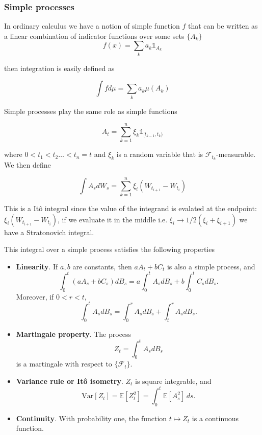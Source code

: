\documentclass[11pt,a4paper]{article}
\begin{document}
\subsubsection{Simple processes}

In ordinary calculus we have a notion of simple function $f$ that can be written as a linear combination of indicator functions over some sets $\{A_k\}$
\begin{equation}
    f(x) = \sum_{k}a_k \mathds{1}_{A_k}
\end{equation} 

then integration is easily defined as 

\begin{equation}
    \int f d\mu = \sum_{k}a_k \mu(A_k)
\end{equation}

Simple processes play the same role as simple functions

\begin{equation}
A_t = \sum_{k=1}^{n} \xi_k  \mathds{1}_{[t_{k-1},t_{k})}   
\end{equation}

where $0<t_1<t_2 \dots <t_n = t$ and $\xi_k $ is a random variable that is $\mathcal{F}_{t_k}$-measurable.
We then define

\begin{equation}
    \int A_sdW_s = \sum_{k = 1}^{n}\xi_i(W_{t_{i+1}}-W_{t_i})
\end{equation}

This is a It\^{o} integral since the value of the integrand is evalated at the endpoint: $\xi_i(W_{t_{i+1}}-W_{t_i})$, if we evaluate it in the middle i.e. $\xi_i \to 1/2(\xi_i+\xi_{i+1})$ we have a Stratonovich integral.

This integral over a simple process satisfies the following properties

\begin{itemize}
    \item 
\textbf{Linearity}. If \(a, b\) are constants, then \(aA_t + bC_t\)
is also a simple process, and
\[
\int_0^t (aA_s + bC_s) dB_s = a \int_0^t A_s dB_s + b \int_0^t C_s dB_s.
\]
Moreover, if \(0 < r < t\),
\[
\int_0^t A_s dB_s = \int_0^r A_s dB_s + \int_t^r A_s dB_s.
\]
\item
\textbf{Martingale property}. The process
\[
Z_t = \int_0^t A_s dB_s
\]
is a martingale with respect to \(\{ \mathcal{F}_t \}\).
\item
\textbf{Variance rule or It\^{o} isometry}. \(Z_t\) is square integrable, and
\[
\text{Var}[Z_t] = \mathbb{E}[Z_t^2] = \int_0^t \mathbb{E}[A_s^2] \, ds.
\]
\item
\textbf{Continuity}. With probability one, the function \( t \mapsto Z_t \) is a continuous function.
\end{itemize}
\end{document}
